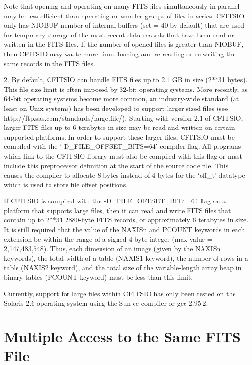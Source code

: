 \documentclass[11pt]{book}
\begin{document}
Note that opening and operating on many FITS files simultaneously in
parallel may be less efficient than operating on smaller groups of files
in series.  CFITSIO only has NIOBUF number of internal buffers (set = 40
by default) that are used for temporary storage of the most recent data
records that have been read or written in the FITS files.  If the number
of opened files is greater than NIOBUF, then CFITSIO may waste more time
flushing and re-reading or re-writing the same records in the FITS files.

2.  By default, CFITSIO can handle FITS files up to 2.1 GB in size
(2**31 bytes).  This file size limit is often imposed by 32-bit
operating systems.  More recently, as 64-bit operating systems become
more common, an industry-wide standard (at least on Unix systems) has
been developed to support larger sized files (see
http://ftp.sas.com/standards/large.file/).  Starting with version 2.1
of CFITSIO, larger FITS files up to 6 terabytes in size may be read and
written on certain supported platforms.  In order to support these
larger files, CFITSIO must be compiled with the
`-D\_FILE\_OFFSET\_BITS=64' compiler flag.  All programs which link to
the CFITSIO library must also be compiled with this flag or must
include this preprocessor definition at the start of the source code
file.  This causes the compiler to allocate 8-bytes instead of 4-bytes
for the `off\_t' datatype which is used to store file offset
positions.

If CFITSIO is compiled with the -D\_FILE\_OFFSET\_BITS=64 flag on a
platform that supports large files, then it can read and write FITS
files that contain up to 2**31 2880-byte FITS records, or approximately
6 terabytes in size.  It is still required that the value of the NAXISn
and PCOUNT keywords in each extension be within the range of a signed
4-byte integer (max value = 2,147,483,648).  Thus, each dimension of an
image (given by the NAXISn keywords), the total width of a table
(NAXIS1 keyword), the number of rows in a table (NAXIS2 keyword), and
the total size of the variable-length array heap in binary tables
(PCOUNT keyword) must be less than this limit.

Currently, support for large files within CFITSIO has only been tested
on the Solaris 2.6 operating system using the Sun cc compiler or gcc
2.95.2.


\section{Multiple Access to the Same FITS File}
\end{document}
